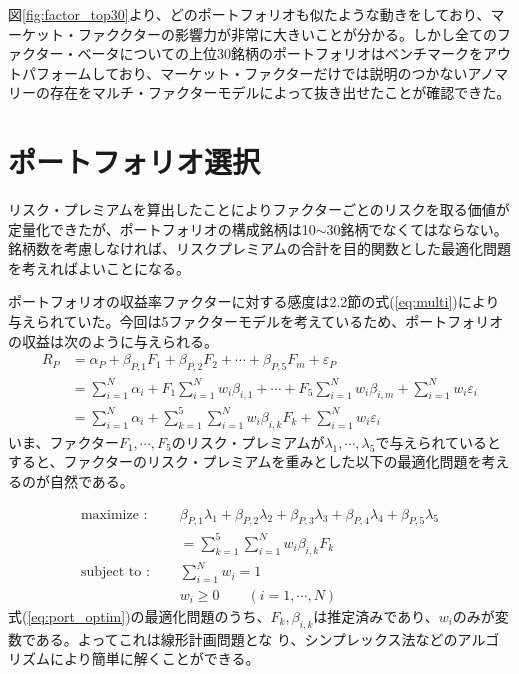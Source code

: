 \documentclass[11pt]{jreport}
\begin{document}
図\ref{fig:factor_top30}より、どのポートフォリオも似たような動きをしており、マーケット・ファククターの影響力が非常に大きいことが分かる。しかし全てのファクター・ベータについての上位30銘柄のポートフォリオはベンチマークをアウトパフォームしており、マーケット・ファクターだけでは説明のつかないアノマリーの存在をマルチ・ファクターモデルによって抜き出せたことが確認できた。

\section{ポートフォリオ選択}
リスク・プレミアムを算出したことによりファクターごとのリスクを取る価値が定量化できたが、ポートフォリオの構成銘柄は10$\sim$30銘柄でなくてはならない。銘柄数を考慮しなければ、リスクプレミアムの合計を目的関数とした最適化問題を考えればよいことになる。

ポートフォリオの収益率ファクターに対する感度は2.2節の式(\ref{eq:multi})により与えられていた。今回は5ファクターモデルを考えているため、ポートフォリオの収益は次のように与えられる。
\begin{equation}
\begin{split}
R_P &= \alpha_P + \beta_{P,1} F_1 + \beta_{P,2} F_2 + \cdots + \beta_{P,5} F_m + \varepsilon_P\\
&=\sum_{i=1}^N \alpha_i + F_1 \sum_{i=1}^N w_i \beta_{i,1} + \cdots + F_5 \sum_{i=1}^N w_i \beta_{i,m} + \sum_{i=1}^N w_i\varepsilon_i\\
&= \sum_{i=1}^N \alpha_i + \sum_{k=1}^5 \sum_{i=1}^N w_i \beta_{i,k} F_k + \sum_{i=1}^N w_i\varepsilon_i
\label{eq:port}
\end{split}
\end{equation}
いま、ファクター$F_1,\cdots,F_5$のリスク・プレミアムが$\lambda_1,\cdots,\lambda_5$で与えられているとすると、ファクターのリスク・プレミアムを重みとした以下の最適化問題を考えるのが自然である。

\begin{equation}
\begin{split}
\text{maximize : }\quad & \beta_{P,1}\lambda_1 + \beta_{P,2}\lambda_2 + \beta_{P,3}\lambda_3 + \beta_{P,4}\lambda_4 + \beta_{P,5}\lambda_5\\
& = \sum_{k=1}^5 \sum_{i=1}^N w_i \beta_{i,k} F_k\\
\text{subject to : }\quad & \sum_{i=1}^N w_i = 1\\
& w_i \geq 0\qquad(i=1,\cdots,N)
\end{split}
\label{eq:port_optim}
\end{equation}
式(\ref{eq:port_optim})の最適化問題のうち、$F_k, \beta_{i,k}$は推定済みであり、$w_i$のみが変数である。よってこれは線形計画問題とな
り、シンプレックス法などのアルゴリズムにより簡単に解くことができる。
\end{document}

